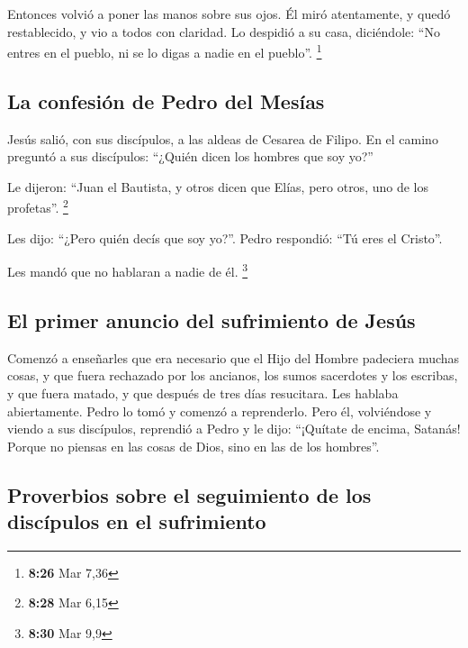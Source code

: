  Entonces volvió a poner las manos sobre sus ojos. Él
miró atentamente, y quedó restablecido, y vio a todos con claridad.
 Lo despidió a su casa, diciéndole: ``No entres en el
pueblo, ni se lo digas a nadie en el pueblo''. \footnote{\textbf{8:26}
  Mar 7,36}

\hypertarget{la-confesiuxf3n-de-pedro-del-mesuxedas}{%
\subsection{La confesión de Pedro del
Mesías}\label{la-confesiuxf3n-de-pedro-del-mesuxedas}}

 Jesús salió, con sus discípulos, a las aldeas de Cesarea
de Filipo. En el camino preguntó a sus discípulos: ``¿Quién dicen los
hombres que soy yo?''

 Le dijeron: ``Juan el Bautista, y otros dicen que Elías,
pero otros, uno de los profetas''. \footnote{\textbf{8:28} Mar 6,15}

 Les dijo: ``¿Pero quién decís que soy yo?''. Pedro
respondió: ``Tú eres el Cristo''.

 Les mandó que no hablaran a nadie de él. \footnote{\textbf{8:30}
  Mar 9,9}

\hypertarget{el-primer-anuncio-del-sufrimiento-de-jesuxfas}{%
\subsection{El primer anuncio del sufrimiento de
Jesús}\label{el-primer-anuncio-del-sufrimiento-de-jesuxfas}}

 Comenzó a enseñarles que era necesario que el Hijo del
Hombre padeciera muchas cosas, y que fuera rechazado por los ancianos,
los sumos sacerdotes y los escribas, y que fuera matado, y que después
de tres días resucitara.  Les hablaba abiertamente. Pedro
lo tomó y comenzó a reprenderlo.  Pero él, volviéndose y
viendo a sus discípulos, reprendió a Pedro y le dijo: ``¡Quítate de
encima, Satanás! Porque no piensas en las cosas de Dios, sino en las de
los hombres''.

\hypertarget{proverbios-sobre-el-seguimiento-de-los-discuxedpulos-en-el-sufrimiento}{%
\subsection{Proverbios sobre el seguimiento de los discípulos en el
sufrimiento}\label{proverbios-sobre-el-seguimiento-de-los-discuxedpulos-en-el-sufrimiento}}

